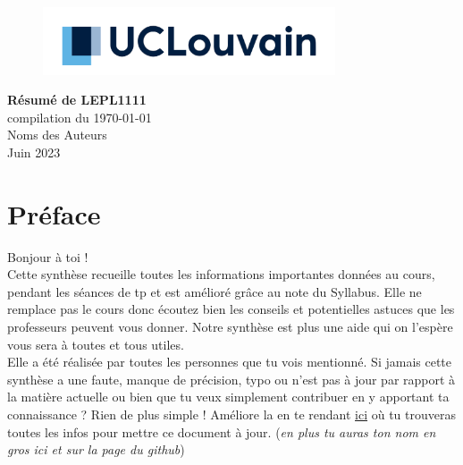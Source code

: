\documentclass{report}
\begin{document}
\begin{titlepage}
    \begin{figure}
        \includegraphics[height = 2cm]{UCL_Logo.png}
        \label{fig:my_label}
    \end{figure}

    \hspace*{100cm}
    \centering
    \vspace*{7cm}

    {\Huge \textbf{Résumé de LEPL1111}}\\
    \vspace*{0.25cm}
    compilation du \today\\
    \vspace*{0.25cm}
    \Large{Noms des Auteurs}\\

    \vspace*{9.5cm} %
    {\Large Juin 2023}
\end{titlepage}

\tableofcontents
\newpage

\section*{Préface}

Bonjour à toi !\\

Cette synthèse recueille toutes les informations importantes données au cours, pendant les séances de tp et est amélioré grâce au note du Syllabus. Elle ne remplace pas le cours donc écoutez bien les conseils et potentielles astuces que les professeurs peuvent vous donner. Notre synthèse est plus une aide qui on l'espère vous sera à toutes et tous utiles.\\

Elle a été réalisée par toutes les personnes que tu vois mentionné. Si jamais cette synthèse a une faute, manque de précision, typo ou n'est pas à jour par rapport à la matière actuelle ou bien que tu veux simplement contribuer en y apportant ta connaissance ? Rien de plus simple ! Améliore la en te rendant \href{http://www.github.com/Tfloow/Q4_EPL}{ici} où tu trouveras toutes les infos pour mettre ce document à jour. (\textit{en plus tu auras ton nom en gros ici et sur la page du github})\\
\end{document}
